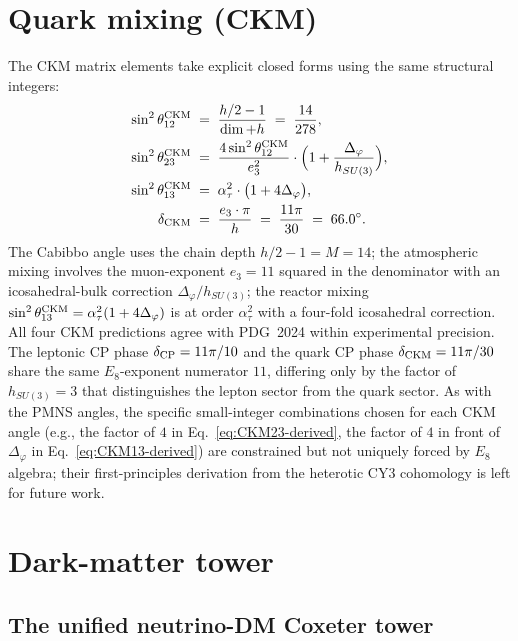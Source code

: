 ﻿\documentclass[reprint,amsmath,amssymb,aps,prd,longbibliography,floatfix]{revtex4-2}
\providecommand{\degree}{^{\circ}}
\begin{document}
\section{Quark mixing (CKM)}
\label{sec:CKM}

The CKM matrix elements take explicit closed forms using the same
structural integers:
\begin{align}
\sin^2 \theta_{12}^{\rm CKM} \;&=\; \frac{h/2 - 1}{\dim + h}
                                 \;=\; \frac{14}{278},
   \label{eq:CKM12-derived} \\
\sin^2 \theta_{23}^{\rm CKM} \;&=\; \frac{4 \sin^2 \theta_{12}^{\rm CKM}}{e_3^2} \cdot \Bigl(1 + \frac{\Delta_\varphi}{h_{SU(3)}}\Bigr),
   \label{eq:CKM23-derived} \\
\sin^2 \theta_{13}^{\rm CKM} \;&=\; \alpha_\tau^2 \cdot \bigl(1 + 4 \Delta_\varphi\bigr),
   \label{eq:CKM13-derived} \\
\delta_{\rm CKM} \;&=\; \frac{e_3 \cdot \pi}{h}
                  \;=\; \frac{11\pi}{30}
                  \;=\; 66.0\degree.
   \label{eq:dCKM-derived}
\end{align}
The Cabibbo angle uses the chain depth $h/2 - 1 = M = 14$; the
atmospheric mixing involves the muon-exponent $e_3 = 11$ squared in
the denominator with an icosahedral-bulk correction $\Delta_\varphi /
h_{SU(3)}$; the reactor mixing
$\sin^2\theta_{13}^{\rm CKM} = \alpha_\tau^2 (1 + 4\Delta_\varphi)$
is at order $\alpha_\tau^2$ with a four-fold icosahedral correction.
All four CKM predictions agree with PDG~2024 within experimental
precision. The leptonic CP phase $\delta_{\rm CP} = 11\pi/10$ and
the quark CP phase $\delta_{\rm CKM} = 11\pi/30$ share the same
$E_8$-exponent numerator $11$, differing only by the factor of
$h_{SU(3)} = 3$ that distinguishes the lepton sector from the
quark sector. As with the PMNS angles, the specific small-integer
combinations chosen for each CKM angle (e.g., the factor of $4$ in
Eq.~\eqref{eq:CKM23-derived}, the factor of $4$ in front of
$\Delta_\varphi$ in Eq.~\eqref{eq:CKM13-derived}) are constrained but
not uniquely forced by $E_8$ algebra; their first-principles
derivation from the heterotic CY3 cohomology is left for future
work.

\section{Dark-matter tower}
\label{sec:DM}

\subsection{The unified neutrino-DM Coxeter tower}
\end{document}
